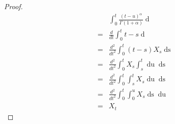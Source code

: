 \documentclass[a4paper, twoside, 11pt]{article}
\theoremstyle{definition}
\begin{document}
\begin{proof}
  \begin{eqnarray*}
	&&\int_0^t \frac{(t-u)^\alpha}{\Gamma(1+\alpha)}\mathop{dX^{(\alpha)}_u}\nonumber\\
	&=& \frac{d}{dt}\int_0^t t-s \mathop{dX_s}\\
	&=& \frac{d^2}{dt^2}\int_0^t (t-s) X_s \mathop{ds}\\
	&=& \frac{d^2}{dt^2}\int_0^t X_s \int_s^t \mathop{du}  \mathop{ds}\\
	&=& \frac{d^2}{dt^2} \int_0^t \int_s^t X_s \mathop{du}  \mathop{ds}\\
	&=& \frac{d^2}{dt^2} \int_0^t \int_0^u X_s \mathop{ds}  \mathop{du}\\
	&=& X_t
  \end{eqnarray*}
\end{proof}
\end{document}
